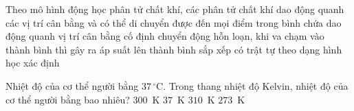 	\begin{ex}%
		Theo mô hình động học phân tử chất khí, các phân tử chất khí
		\choice
		{dao động quanh các vị trí cân bằng và có thể di chuyển được đến mọi điểm trong bình chứa}
		{dao động quanh vị trí cân bằng cố định}
		{\True chuyển động hỗn loạn, khi va chạm vào thành bình thì gây ra áp suất lên thành bình}
		{sắp xếp có trật tự theo dạng hình học xác định}
	\end{ex}

	\begin{ex}%
		Nhiệt độ của cơ thể người bằng $37\,^\circ\text{C}$. Trong thang nhiệt độ Kelvin, nhiệt độ của cơ thể người bằng bao nhiêu?
		\choice
		{$300$~K}
		{$37$~K}
		{\True $310$~K}
		{$273$~K}
	\end{ex}

